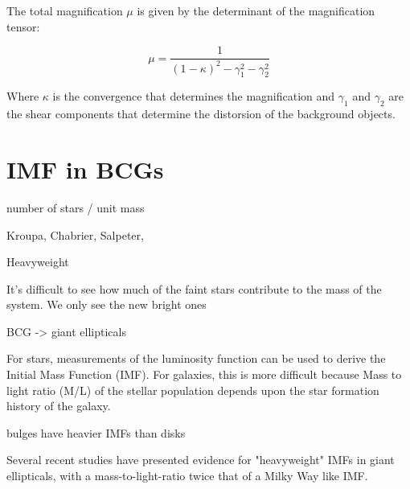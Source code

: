 The total magnification $\mu$ is given by the determinant of the magnification tensor:

\begin{equation}
\mu = \frac{1}{(1-\kappa)^{2}-\gamma^{2}_{1}-\gamma^{2}_{2}}
\end{equation}

Where $\kappa$ is the convergence that determines the magnification and $\gamma_{1}$ and $\gamma_{2}$ are the shear components that determine the distorsion of the background objects.

\section{IMF in BCGs}

number of stars / unit mass

Kroupa, Chabrier, Salpeter, 

Heavyweight

It's difficult to see how much of the faint stars contribute to the mass of the system. We only see the new bright ones

BCG -> giant ellipticals

For stars, measurements of the luminosity function can be
used to derive the Initial Mass Function (IMF).
For galaxies, this is more difficult because Mass to light ratio (M/L) of the stellar population
depends upon the star formation history of
the galaxy.

bulges have heavier IMFs than disks

Several recent studies have presented evidence for "heavyweight" IMFs in giant ellipticals, with a mass-to-light-ratio twice that of a Milky Way like IMF.



 
 